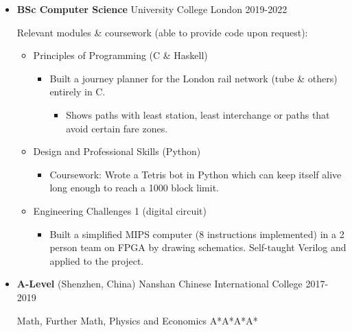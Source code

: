   \begin{itemize}
    \def\ongoing{%
    }
    \item \ongoing{} \textbf{BSc Computer Science} \dashdiv{} University College London \dashdiv{} 2019-2022

      Relevant modules \& coursework (able to provide code upon request):

      \begin{itemize}

        \item Principles of Programming (C \& Haskell)

        \begin{itemize}
          \item Built a journey planner for the\tflicon{} London rail network (tube \& others) entirely in C.

          \begin{itemize}
            \item Shows paths with least station, least interchange or paths that avoid certain fare zones.
          \end{itemize}
        \end{itemize}

        \item Design and Professional Skills (Python)

        \begin{itemize}
          \item Coursework: Wrote a Tetris bot in Python which can keep itself alive long enough to reach a 1000 block limit.
        \end{itemize}

        \item Engineering Challenges 1 (digital circuit)

        \begin{itemize}
          \item Built a simplified MIPS computer (8 instructions implemented) in a 2 person team on FPGA by drawing schematics. Self-taught Verilog and applied to the project.
        \end{itemize}

      \end{itemize}

    \item \textbf{A-Level} \dashdiv{} (Shenzhen, China) Nanshan Chinese International College \dashdiv{} 2017-2019

      Math, Further Math, Physics and Economics \dashdiv{} A*A*A*A*
  \end{itemize}

